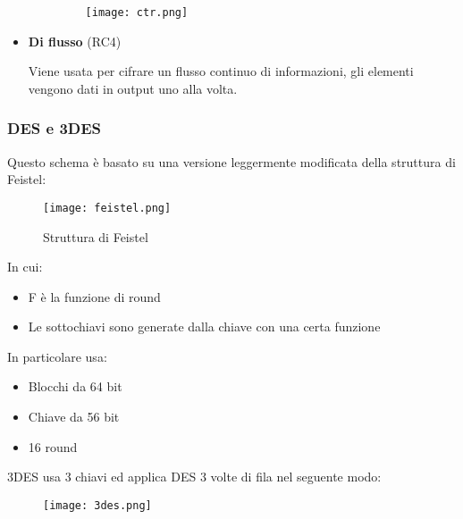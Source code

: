 \documentclass{article}
\begin{document}
\begin{itemize}
\begin{itemize}
                \begin{figure}[ht]
                    \centering
                    \texttt{[image: ctr.png]}
                \end{figure}                   
            
        \end{itemize}
    
    \item \textbf{Di flusso} (RC4)

        Viene usata per cifrare un flusso continuo di informazioni, gli elementi vengono dati in output uno alla volta.
    
\end{itemize}

\newpage

\subsubsection{DES e 3DES}

Questo schema è basato su una versione leggermente modificata della struttura di Feistel:

\begin{figure}[ht]
    \centering
    \texttt{[image: feistel.png]}
    \caption{Struttura di Feistel}
\end{figure}

\noindent In cui:
\begin{itemize}
    \item F è la funzione di round
    \item Le sottochiavi sono generate dalla chiave con una certa funzione\newline
\end{itemize}

\noindent In particolare usa:
\begin{itemize}
    \item Blocchi da 64 bit
    \item Chiave da 56 bit
    \item 16 round
\end{itemize}

\newpage

\noindent 3DES usa 3 chiavi ed applica DES 3 volte di fila nel seguente modo:

\begin{figure}[ht]
    \centering
    \texttt{[image: 3des.png]}
\end{figure}
\end{document}
